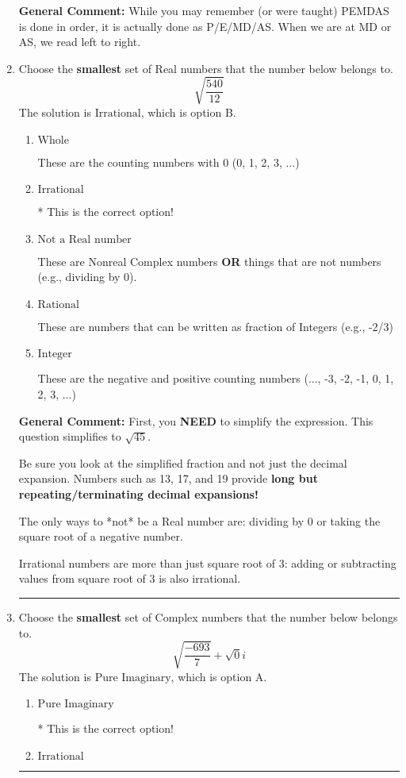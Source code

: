 \documentclass{extbook}[14pt]
\newcommand{\litem}[1]{\item #1

\rule{\textwidth}{0.4pt}}
\begin{document}
\begin{enumerate}
{\textbf{General Comment:} While you may remember (or were taught) PEMDAS is done in order, it is actually done as P/E/MD/AS. When we are at MD or AS, we read left to right.
}
\litem{
Choose the \textbf{smallest} set of Real numbers that the number below belongs to.
\[ \sqrt{\frac{540}{12}} \]The solution is \( \text{Irrational} \), which is option B.\begin{enumerate}[label=\Alph*.]
\item \( \text{Whole} \)

These are the counting numbers with 0 (0, 1, 2, 3, ...)
\item \( \text{Irrational} \)

* This is the correct option!
\item \( \text{Not a Real number} \)

These are Nonreal Complex numbers \textbf{OR} things that are not numbers (e.g., dividing by 0).
\item \( \text{Rational} \)

These are numbers that can be written as fraction of Integers (e.g., -2/3)
\item \( \text{Integer} \)

These are the negative and positive counting numbers (..., -3, -2, -1, 0, 1, 2, 3, ...)
\end{enumerate}

\textbf{General Comment:} First, you \textbf{NEED} to simplify the expression. This question simplifies to $\sqrt{45}$. 
 
 Be sure you look at the simplified fraction and not just the decimal expansion. Numbers such as 13, 17, and 19 provide \textbf{long but repeating/terminating decimal expansions!} 
 
 The only ways to *not* be a Real number are: dividing by 0 or taking the square root of a negative number. 
 
 Irrational numbers are more than just square root of 3: adding or subtracting values from square root of 3 is also irrational.
}
\litem{
Choose the \textbf{smallest} set of Complex numbers that the number below belongs to.
\[ \sqrt{\frac{-693}{7}}+\sqrt{0}i \]The solution is \( \text{Pure Imaginary} \), which is option A.\begin{enumerate}[label=\Alph*.]
\item \( \text{Pure Imaginary} \)

* This is the correct option!
\item \( \text{Irrational} \)


\end{enumerate}}
\end{enumerate}
\end{document}
